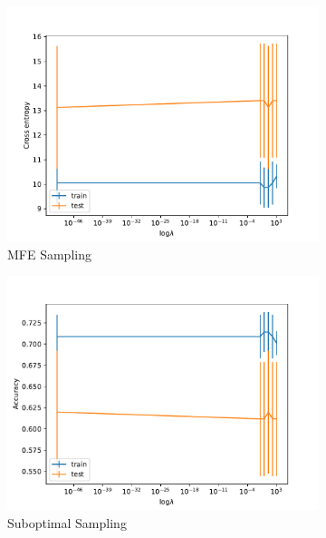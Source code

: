\documentclass[11pt]{amsart}
\begin{document}
\begin{figure}
    \centering
    \begin{subfigure}{0.45\textwidth}
        \includegraphics[width=\textwidth]{q1d_crossentropy.pdf}
        \caption{MFE Sampling}
        \label{fig:rnamutsnomfe_freq}
    \end{subfigure}
    \begin{subfigure}{0.45\textwidth}
        \includegraphics[width=\textwidth]{q1d_accuracy.pdf}
        \caption{Suboptimal Sampling}
        \label{fig:ranmutsnomfe_freq}
    \end{subfigure}
    \begin{subfigure}{0.45\textwidth}

\end{subfigure}
\end{figure}
\end{document}
